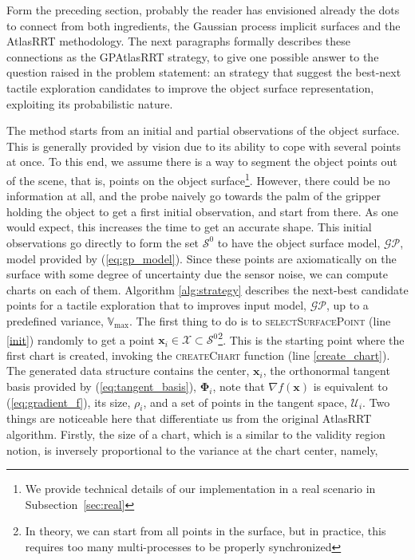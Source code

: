 Form the preceding section, probably the reader has envisioned already the dots to connect from both ingredients, the Gaussian process implicit surfaces and the AtlasRRT methodology. The next paragraphs formally describes these connections as the GPAtlasRRT strategy, to give one possible answer to the question raised in the problem statement: an strategy that suggest the best-next tactile exploration candidates to improve the object surface representation, exploiting its probabilistic nature. 

The method starts from an initial and partial observations of the object surface. This is generally provided by vision due to its ability to cope with several points at once. To this end, we assume there is a way to segment the object points out of the scene, that is, points on the object surface\footnote{We provide technical details of our implementation in a real scenario in Subsection~\ref{sec:real}}. However, there could be no information at all, and the probe naively go towards the palm of the gripper holding the object to get a first initial observation, and start from there. As one would expect, this increases the time to get an accurate shape. This initial observations go directly to form the set $\mathcal{S}^0$ to have the object surface model, $\mathcal{GP}$, model provided by (\ref{eq:gp_model}). Since these points are axiomatically on the surface with some degree of uncertainty due the sensor noise, we can compute charts on each of them.
Algorithm \ref{alg:strategy} describes the next-best candidate points for a tactile exploration that to improves input model, $\mathcal{GP}$, up to a predefined variance, $\mathbb{V}_{\max}$. 
The first thing to do is to \textsc{selectSurfacePoint} (line \ref{init}) randomly to get a point $\mathbf{x}_i \in \mathcal{X} \subset \mathcal{S}^0$\footnote{In theory, we can start from all points in the surface, but in practice, this requires too many multi-processes to be properly synchronized}. This is the starting point where the first chart is created, invoking the \textsc{createChart} function (line \ref{create_chart}). The generated data structure contains the center, $\mathbf{x}_i$, the orthonormal tangent basis provided by (\ref{eq:tangent_basis}), $\boldsymbol{\Phi}_i$, note that $\nabla f(\mathbf{x})$ is equivalent to (\ref{eq:gradient_f}), its size, $\rho_i$, and a set of points in the tangent space, $\mathcal{U}_i$. Two things are noticeable here that differentiate us from the original AtlasRRT algorithm. Firstly, the size of a chart, which is a similar to the validity region notion, is inversely proportional to the variance at the chart center, namely,
